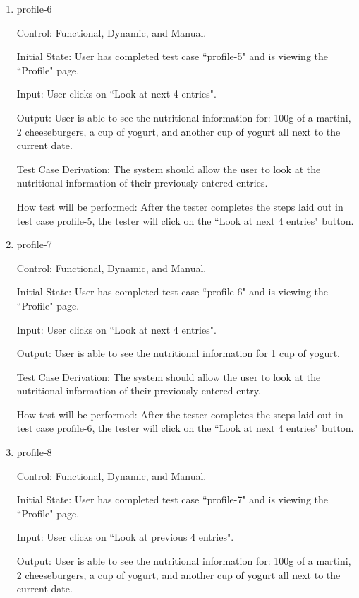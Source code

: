 \documentclass[12pt, titlepage]{article}
\begin{document}
\begin{enumerate}
		\item{profile-6\\}
		
		Control: Functional, Dynamic, and Manual.
		
		Initial State: User has completed test case ``profile-5" and is viewing the ``Profile" page.
		
		Input: User clicks on ``Look at next 4 entries".
		
		Output: User is able to see the nutritional information for: 100g of a martini, 2 cheeseburgers, a cup of yogurt, and another cup of yogurt all next to the current date.
		
		Test Case Derivation: The system should allow the user to look at the nutritional information of their previously entered entries.
		
		How test will be performed: After the tester completes the steps laid out in test case profile-5, the tester will click on the ``Look at next 4 entries" button.
		
		\item{profile-7\\}
		
		Control: Functional, Dynamic, and Manual.
		
		Initial State: User has completed test case ``profile-6" and is viewing the ``Profile" page.
		
		Input: User clicks on ``Look at next 4 entries".
		
		Output: User is able to see the nutritional information for 1 cup of yogurt.
		
		Test Case Derivation: The system should allow the user to look at the nutritional information of their previously entered entry.
		
		How test will be performed: After the tester completes the steps laid out in test case profile-6, the tester will click on the ``Look at next 4 entries" button.
		
		\item{profile-8\\}
		
		Control: Functional, Dynamic, and Manual.
		
		Initial State: User has completed test case ``profile-7" and is viewing the ``Profile" page.
		
		Input: User clicks on ``Look at previous 4 entries".
		
		Output: User is able to see the nutritional information for: 100g of a martini, 2 cheeseburgers, a cup of yogurt, and another cup of yogurt all next to the current date.
		

\end{enumerate}
\end{document}
